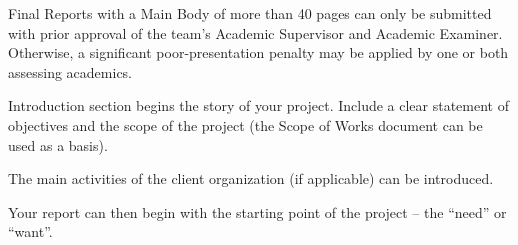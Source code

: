 Final Reports with a Main Body of more than 40 pages can only be submitted with prior approval of the team’s Academic Supervisor and Academic Examiner.  Otherwise, a significant poor-presentation penalty may be applied by one or both assessing academics.

Introduction section begins the story of your project.  Include a clear statement of objectives and the scope of the project (the Scope of Works document can be used as a basis).

The main activities of the client organization (if applicable) can be introduced.

Your report can then begin with the starting point of the project – the “need” or “want”. 
